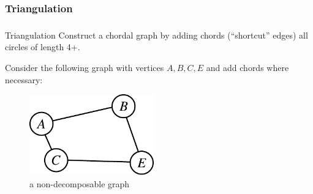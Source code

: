 \subsubsection{Triangulation}

\begin{frame}\frametitle{\subsubsecname}

\begin{block}{Triangulation}
Construct a chordal graph by adding chords (``shortcut'' edges) all circles of length 4+.
\end{block} 

Consider the following graph with vertices $A,B,C,E$ and add chords where necessary:


	\begin{figure}[h]
	\centering
	\includegraphics[height=3.5cm]{img/graph_example_triangulate}
	\caption{a non-decomposable graph}
	\end{figure}


\end{frame}
